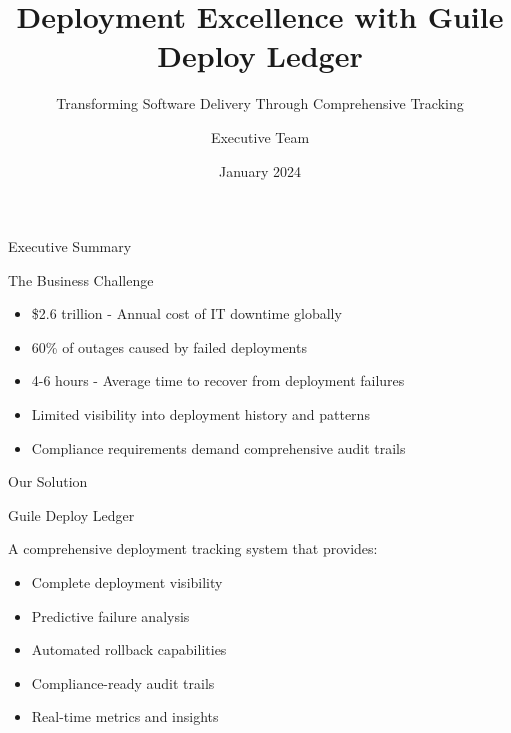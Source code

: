 \documentclass[presentation,aspectratio=169]{beamer}
\author{Executive Team}
\date{January 2024}
\title{Deployment Excellence with Guile Deploy Ledger}
\subtitle{Transforming Software Delivery Through Comprehensive Tracking}
\begin{document}
\maketitle
\begin{frame}[label={sec:orgae3d00e}]{Executive Summary}
\begin{block}{The Business Challenge}
\begin{itemize}[<+->]
\item \alert{\$2.6 trillion} - Annual cost of IT downtime globally
\item \alert{60\%} of outages caused by failed deployments
\item \alert{4-6 hours} - Average time to recover from deployment failures
\item \alert{Limited visibility} into deployment history and patterns
\item \alert{Compliance requirements} demand comprehensive audit trails
\end{itemize}
\end{block}
\begin{block}{Our Solution}
\begin{center}
\alert{Guile Deploy Ledger}

A comprehensive deployment tracking system that provides:

\begin{itemize}[<+->]
\item Complete deployment visibility
\item Predictive failure analysis
\item Automated rollback capabilities
\item Compliance-ready audit trails
\item Real-time metrics and insights
\end{itemize}
\end{center}
\end{block}
\end{frame}
\end{document}
